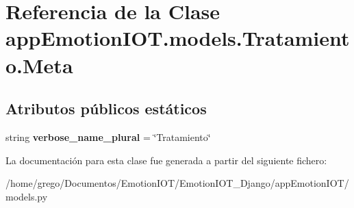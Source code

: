 \hypertarget{classappEmotionIOT_1_1models_1_1Tratamiento_1_1Meta}{}\section{Referencia de la Clase app\+Emotion\+I\+O\+T.\+models.\+Tratamiento.\+Meta}
\label{classappEmotionIOT_1_1models_1_1Tratamiento_1_1Meta}
\subsection*{Atributos públicos estáticos}
\begin{DoxyCompactItemize}
\item 
string {\bfseries verbose\+\_\+name\+\_\+plural} = \char`\"{}Tratamiento\char`\"{}\hypertarget{classappEmotionIOT_1_1models_1_1Tratamiento_1_1Meta_aa55c72d5d57993ecac20bacf03d33e73}{}\label{classappEmotionIOT_1_1models_1_1Tratamiento_1_1Meta_aa55c72d5d57993ecac20bacf03d33e73}

\end{DoxyCompactItemize}


La documentación para esta clase fue generada a partir del siguiente fichero\+:\begin{DoxyCompactItemize}
\item 
/home/grego/\+Documentos/\+Emotion\+I\+O\+T/\+Emotion\+I\+O\+T\+\_\+\+Django/app\+Emotion\+I\+O\+T/models.\+py\end{DoxyCompactItemize}
